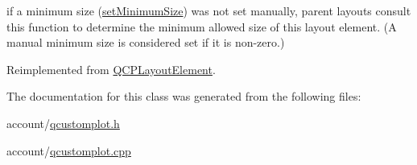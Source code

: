 if a minimum size (\hyperlink{classQCPLayoutElement_a5dd29a3c8bc88440c97c06b67be7886b}{set\-Minimum\-Size}) was not set manually, parent layouts consult this function to determine the minimum allowed size of this layout element. (\-A manual minimum size is considered set if it is non-\/zero.) 

\-Reimplemented from \hyperlink{classQCPLayoutElement_aebe14fb71f858c0f98caf8d342a9864a}{\-Q\-C\-P\-Layout\-Element}.



\-The documentation for this class was generated from the following files\-:\begin{DoxyCompactItemize}
\item 
account/\hyperlink{qcustomplot_8h}{qcustomplot.\-h}\item 
account/\hyperlink{qcustomplot_8cpp}{qcustomplot.\-cpp}\end{DoxyCompactItemize}
